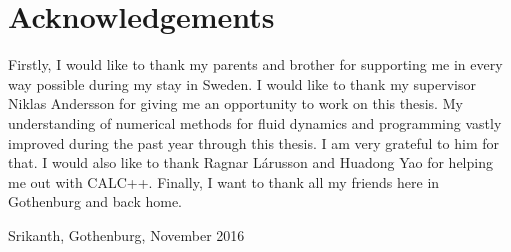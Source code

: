\thispagestyle{plain}			%
\section*{Acknowledgements}
Firstly, I would like to thank my parents and brother for supporting me in every way possible during my stay in Sweden. I would like to thank my supervisor Niklas Andersson for giving me an opportunity to work on this thesis. My understanding of numerical methods for fluid dynamics and programming vastly improved during the past year through this thesis. I am very grateful to him for that. I would also like to thank Ragnar Lárusson and Huadong Yao for helping me out with CALC++. Finally, I want to thank all my friends here in Gothenburg and back home.


\vspace{1.5cm}
\hfill
Srikanth, Gothenburg, November 2016

\newpage				%
\thispagestyle{empty}
\mbox{}